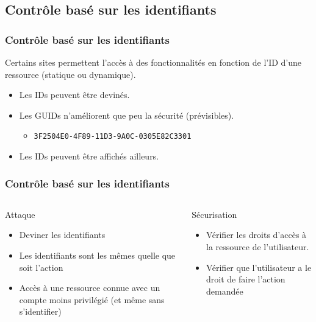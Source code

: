 \documentclass[aspectratio=169]{beamer}  %
\begin{document}
\subsection{Contrôle basé sur les identifiants}
\begin{frame}
  \frametitle{Contrôle basé sur les identifiants}
  Certains sites permettent l'accès à des fonctionnalités en fonction de l'ID d'une ressource (statique ou dynamique).
  \vspace{2em}
  \begin{itemize}
    \item Les IDs peuvent être devinés.
    \item Les GUIDs n'améliorent que peu la sécurité (prévisibles).
    \begin{itemize}
      \item \texttt{3F2504E0-4F89-11D3-9A0C-0305E82C3301}
    \end{itemize}
    \item Les IDs peuvent être affichés ailleurs.
  \end{itemize}
\end{frame}
\begin{frame}
  \frametitle{Contrôle basé sur les identifiants}
  \begin{columns}[T]
      \begin{alertblock}{Attaque}
        \begin{itemize}
          \item Deviner les identifiants
          \item Les identifiants sont les mêmes quelle que soit l’action
          \item Accès à une ressource connue avec un compte moins privilégié (et même sans s'identifier)
        \end{itemize}
      \end{alertblock}
      \begin{exampleblock}{Sécurisation}
        \begin{itemize}
          \item Vérifier les droits d'accès à la ressource de l'utilisateur.
          \item Vérifier que l'utilisateur a le droit de faire l'action demandée
        \end{itemize}
      \end{exampleblock}
  \end{columns}
\end{frame}
\end{document}
